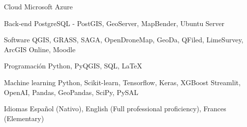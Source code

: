 

\begin{cvskills}

  \cvskill
    {Cloud} %
    {Microsoft Azure} %

  \cvskill
    {Back-end} %
    {PostgreSQL - PostGIS, GeoServer, MapBender, Ubuntu Server} %

  \cvskill
    {Software} %
    {QGIS, GRASS, SAGA, OpenDroneMap, GeoDa, QFiled, LimeSurvey,
    ArcGIS Online, Moodle} %

  \cvskill
    {Programación} %
    {Python, PyQGIS, SQL, \LaTeX} %

  \cvskill
    {Machine learning} %
    {Python, Scikit-learn, Tensorflow, Keras, XGBoost Streamlit, OpenAI, Pandas,
    GeoPandas, SciPy, PySAL} %

  \cvskill
    {Idiomas} %
    {Español (Nativo),
    English (Full professional proficiency),
    Frances (Elementary)} %

\end{cvskills}
